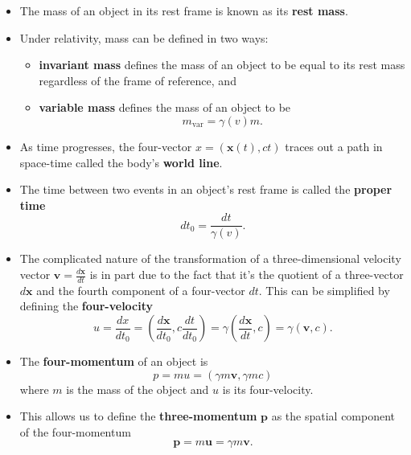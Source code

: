 \documentclass{article}
\renewcommand{\vec}[1]{\boldsymbol{\mathbf{#1}}}
\begin{document}
\begin{itemize}
  \item The mass of an object in its rest frame is known as its \textbf{rest mass}.

  \item Under relativity, mass can be defined in two ways:

        \begin{itemize}
          \item \textbf{invariant mass} defines the mass of an object to be equal to its rest mass regardless of the frame of reference, and

          \item \textbf{variable mass} defines the mass of an object to be \[m_\text{var} = \gamma(v) m.\]
        \end{itemize}

  \item As time progresses, the four-vector $x = (\vec{x}(t), c t)$ traces out a path in space-time called the body's \textbf{world line}.

  \item The time between two events in an object's rest frame is called the \textbf{proper time} \[d t_0 = \frac{d t}{\gamma(v)}.\]

  \item The complicated nature of the transformation of a three-dimensional velocity vector $\vec{v} = \frac{d \vec{x}}{d t}$ is in part due to the fact that it's the quotient of a three-vector $d \vec{x}$ and the fourth component of a four-vector $d t$. This can be simplified by defining the \textbf{four-velocity} \[u = \frac{d x}{d t_0} = \left( \frac{d \vec{x}}{d t_0}, c \frac{d t}{d t_0} \right) = \gamma \left( \frac{d \vec{x}}{d t}, c \right) = \gamma (\vec{v}, c).\]

  \item The \textbf{four-momentum} of an object is \[p = m u = (\gamma m \vec{v}, \gamma m c)\] where $m$ is the mass of the object and $u$ is its four-velocity.

  \item This allows us to define the \textbf{three-momentum} $\vec{p}$ as the spatial component of the four-momentum \[\vec{p} = m \vec{u} = \gamma m \vec{v}.\]
\end{itemize}
\end{document}
